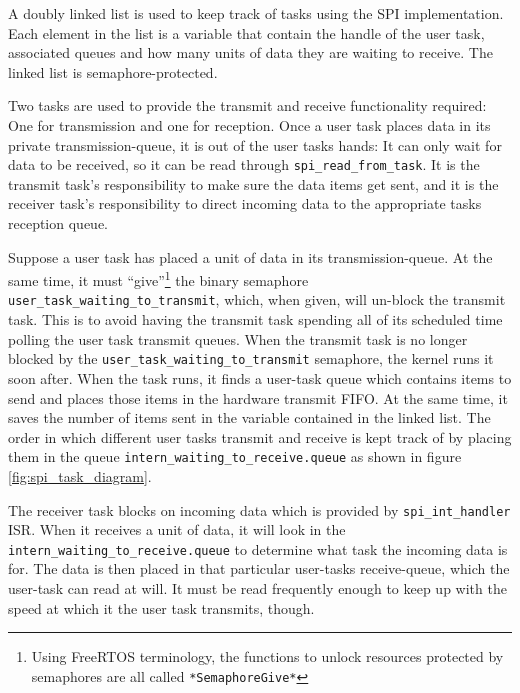 A doubly linked list is used to keep track of tasks using the SPI implementation. Each element in the list is a variable that contain the handle of the user task, associated queues and how many units of data they are waiting to receive. The linked list is semaphore-protected.

Two tasks are used to provide the transmit and receive functionality required: One for transmission and one for reception. Once a user task places data in its private transmission-queue, it is out of the user tasks hands: It can only wait for data to be received, so it can be read through \texttt{spi\_read\_from\_task}. It is the transmit task's responsibility to make sure the data items get sent, and it is the receiver task's responsibility to direct incoming data to the appropriate tasks reception queue.

Suppose a user task has placed a unit of data in its transmission-queue. At the same time, it must ``give''\footnote{Using FreeRTOS terminology, the functions to unlock resources protected by semaphores are all called \texttt{*SemaphoreGive*}} the binary semaphore \texttt{user\_task\_waiting\_to\_transmit}, which, when given, will un-block the transmit task. This is to avoid having the transmit task spending all of its scheduled time polling the user task transmit queues. When the transmit task is no longer blocked by the \texttt{user\_task\_waiting\_to\_transmit} semaphore, the kernel runs it soon after. When the task runs, it finds a user-task queue which contains items to send and places those items in the hardware transmit FIFO. At the same time, it saves the number of items sent in the variable contained in the linked list. The order in which different user tasks transmit and receive is kept track of by placing them in the queue \texttt{intern\_waiting\_to\_receive.queue} as shown in figure \ref{fig:spi_task_diagram}.

The receiver task blocks on incoming data which is provided by \texttt{spi\_int\_handler} ISR. When it receives a unit of data, it will look in the \texttt{intern\_waiting\_to\_receive.queue} to determine what task the incoming data is for. The data is then placed in that particular user-tasks receive-queue, which the user-task can read at will. It must be read frequently enough to keep up with the speed at which it the user task transmits, though.

